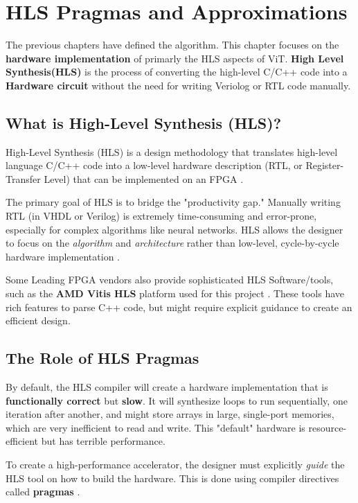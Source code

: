 \chapter{HLS Pragmas and Approximations}

The previous chapters have defined the algorithm. This chapter focuses on the \textbf{hardware implementation} of primarly the HLS aspects of ViT. \textbf{High Level Synthesis(HLS)} is the process of converting the high-level C/C++ code into a \textbf{Hardware circuit} without the need for writing Veriolog or RTL code manually.

\section{What is High-Level Synthesis (HLS)?}

High-Level Synthesis (HLS) is a design methodology that translates  high-level language C/C++ code into a low-level hardware description (RTL, or Register-Transfer Level) that can be implemented on an FPGA \cite{ref5, ref6}.

The primary goal of HLS is to bridge the "productivity gap." Manually writing RTL (in VHDL or Verilog) is extremely time-consuming and error-prone, especially for complex algorithms like neural networks. HLS allows the designer to focus on the \textit{algorithm} and \textit{architecture} rather than low-level, cycle-by-cycle hardware implementation \cite{ref6}.

Some Leading FPGA vendors also provide sophisticated HLS Software/tools, such as the \textbf{AMD Vitis HLS} platform used for this project \cite{ref6}. These tools have rich features to parse C++ code, but might require explicit guidance to  create an efficient design.

\section{The Role of HLS Pragmas}

By default, the HLS compiler will create a hardware implementation that is \textbf{functionally correct} but \textbf{slow}. It will synthesize loops to run sequentially, one iteration after another, and might store arrays in large, single-port memories, which are very inefficient to read and write. This "default" hardware is resource-efficient but has terrible performance.

To create a high-performance accelerator, the designer must explicitly \textit{guide} the HLS tool on how to build the hardware. This is done using compiler directives called \textbf{pragmas} \cite{ref2}.

